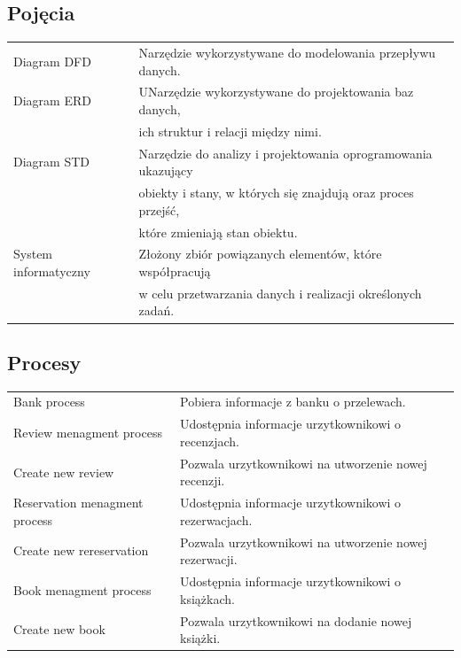 \documentclass[12pt]{article}
\begin{document}
\subsection*{Pojęcia}
\begin{table}[!ht]
    \centering
    \begin{tabularx}{1.01\textwidth}{ll}
        \toprule
        Diagram DFD           & Narzędzie wykorzystywane do modelowania przepływu danych.  \\
        Diagram ERD                       & UNarzędzie wykorzystywane do projektowania baz danych, \\
         & ich struktur i relacji między nimi.\\
        Diagram STD            & Narzędzie do analizy i projektowania oprogramowania ukazujący \\
         & obiekty i stany, w których się znajdują oraz proces przejść, \\
         & które zmieniają stan obiektu.  \\
        System informatyczny        & Złożony zbiór powiązanych elementów, które współpracują \\
        & w celu przetwarzania danych i realizacji określonych zadań. \\
        \bottomrule
    \end{tabularx}
\end{table}

\subsection*{Procesy}
\begin{table}[!ht]
    \centering
    \begin{tabularx}{1.01\textwidth}{ll}
        \toprule
        Bank process           & Pobiera informacje z banku o przelewach.  \\
        Review menagment process                       & Udostępnia informacje urzytkownikowi o recenzjach. \\
        Create new review            & Pozwala urzytkownikowi na utworzenie nowej recenzji.  \\
        Reservation menagment process        &  Udostępnia informacje urzytkownikowi o rezerwacjach. \\
        Create new rereservation            & Pozwala urzytkownikowi na utworzenie nowej rezerwacji.  \\
        Book menagment process        &  Udostępnia informacje urzytkownikowi o książkach. \\
        Create new book            & Pozwala urzytkownikowi na dodanie nowej książki.  \\
        \bottomrule
    \end{tabularx}
\end{table}
\end{document}

